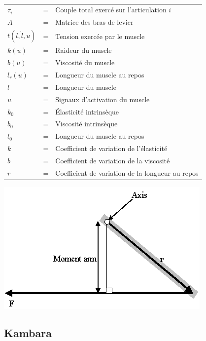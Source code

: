 \documentclass[pdftex,a4paper,11pt]{article}
\begin{document}
\paragraph{}
\begin{tabular}{lcl}
    $\tau_i$ & = & Couple total exercé sur l'articulation $i$ \\
    $A$  & = & Matrice des bras de levier \\
    $t(l, \dot{l}, u)$  & = & Tension exercée par le muscle \\
    $k(u)$ & = & Raideur du muscle \\
    $b(u)$ & = & Viscosité du muscle \\
    $l_r(u)$ & = & Longueur du muscle au repos \\
    $l$ & = & Longueur du muscle \\
    $u$ & = & Signaux d'activation du muscle \\
    $k_0$ & = & Élasticité intrinsèque \\
    $b_0$ & = & Viscosité intrinsèque \\
    $l_0$ & = & Longueur du muscle au repos \\
    $k$ & = & Coefficient de variation de l'élasticité \\
    $b$ & = & Coefficient de variation de la viscosité \\
    $r$ & = & Coefficient de variation de la longueur au repos \\
\end{tabular}

\begin{center}
        \includegraphics[width=.50\linewidth]{fig/moment_arm}
\end{center}


\subsection{Kambara}
\end{document}
